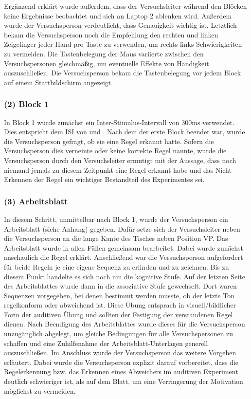 \documentclass[doc,a4paper,12pt]{apa6}
\begin{document}
Ergänzend erklärt wurde außerdem, dass der Versuchsleiter während den Blöcken keine Ergebnisse beobachtet und sich an Laptop 2 ablenken wird. Außerdem wurde der Versuchsperson verdeutlicht, dass Genauigkeit wichtig ist. Letztlich bekam die Versuchsperson noch die Empfehlung den rechten und linken Zeigefinger jeder Hand pro Taste zu verwenden, um rechts-links Schwierigkeiten zu vermeiden. Die Tastenbelegung der Maus variierte zwischen den Versuchspersonen gleichmäßig, um eventuelle Effekte von Händigkeit auszuschließen. Die Versuchsperson bekam die Tastenbelegung vor jedem Block auf einem Startbildschirm angezeigt.


\subsubsection{(2) Block 1}

In Block 1 wurde zunächst ein Inter-Stimulus-Intervall von 300ms verwendet. Dies entspricht dem ISI von \textcite{paavilainen2007preattentive} und \textcite{bendixen2008rapid}. Nach dem der erste Block beendet war, wurde die Versuchsperson gefragt, ob sie eine Regel erkannt hatte. Sofern die Versuchsperson dies verneinte oder keine korrekte Regel nannte, wurde die Versuchsperson durch den Versuchsleiter ermutigt mit der Aussage, dass noch niemand jemals zu diesem Zeitpunkt eine Regel erkannt habe und das Nicht-Erkennen der Regel ein wichtiger Bestandteil des Experimentes sei.

\subsubsection{(3) Arbeitsblatt}

In diesem Schritt, unmittelbar nach Block 1, wurde der Versuchsperson ein Arbeitsblatt (siehe Anhang) gegeben. Dafür setze sich der Versuchsleiter neben die Versuchsperson an die lange Kante des Tisches neben Position VP. Das Arbeitsblatt wurde in allen Fällen gemeinsam bearbeitet. Dabei wurde zunächst anschaulich die Regel erklärt. Anschließend war die Versuchsperson aufgefordert für beide Regeln je eine eigene Sequenz zu erfinden und zu zeichnen. Bis zu diesem Punkt handelte es sich noch um die kognitive Stufe. Auf der letzten Seite des Arbeitsblattes wurde dann in die assoziative Stufe gewechselt. Dort waren Sequenzen vorgegeben, bei denen bestimmt werden musste, ob der letzte Ton regelkonform oder abweichend ist. Diese Übung entsprach in visuell/bildlicher Form der auditiven Übung und sollten der Festigung der verstandenen Regel dienen. Nach Beendigung des Arbeitsblattes wurde dieses für die Versuchsperson unzugänglich abgelegt, um gleiche Bedingungen für alle Versuchspersonen zu schaffen und eine Zuhilfenahme der Arbeitsblatt-Unterlagen generell auszuschließen. Im Anschluss wurde der Versuchsperson das weitere Vorgehen erläutert. Dabei wurde die Versuchsperson explizit darauf vorbereitet, dass die Regelerkennung bzw. das Erkennen eines Abweichers im auditiven Experiment deutlich schwieriger ist, als auf dem Blatt, um eine Verringerung der Motivation möglichst zu vermeiden.
\end{document}
